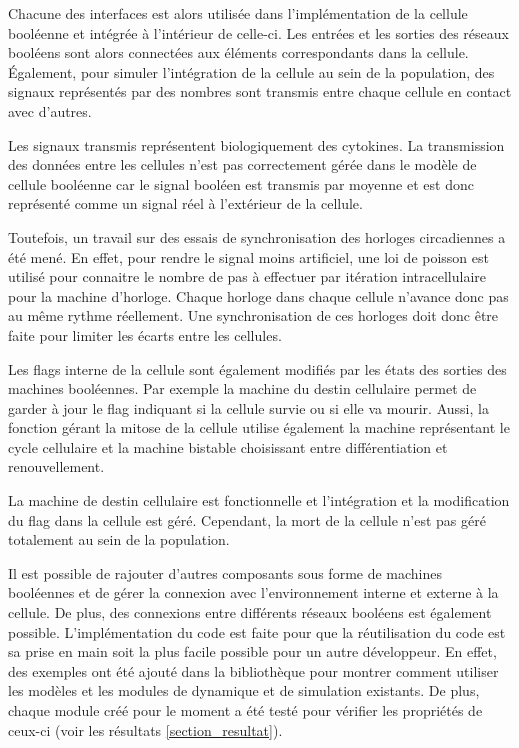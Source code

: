 \documentclass[11pt, a4paper]{article}
\begin{document}
Chacune des interfaces est alors utilisée dans l'implémentation de la cellule
booléenne et intégrée à l'intérieur de celle-ci. Les entrées et les sorties des
réseaux booléens sont alors connectées aux éléments correspondants dans la
cellule. Également, pour simuler l'intégration de la cellule au sein de la
population, des signaux représentés par des nombres sont transmis entre chaque
cellule en contact avec d'autres.

Les signaux transmis représentent biologiquement des cytokines. La transmission
des données entre les cellules n'est pas correctement gérée dans le modèle de
cellule booléenne car le signal booléen est transmis par moyenne et est donc
représenté comme un signal réel à l'extérieur de la cellule.

Toutefois, un travail sur des essais de synchronisation des horloges
circadiennes a été mené. En effet, pour rendre le signal moins artificiel, une
loi de poisson est utilisé pour connaitre le nombre de pas à effectuer par
itération intracellulaire pour la machine d'horloge. Chaque horloge dans
chaque cellule n'avance donc pas au même rythme réellement. Une synchronisation
de ces horloges doit donc être faite pour limiter les écarts entre les
cellules.

Les flags interne de la cellule sont également modifiés par les états des
sorties des machines booléennes. Par exemple la machine du destin cellulaire
permet de garder à jour le flag indiquant si la cellule survie ou si elle va
mourir. Aussi, la fonction gérant la mitose de la cellule utilise également la
machine représentant le cycle cellulaire et la machine bistable choisissant
entre différentiation et renouvellement.

La machine de destin cellulaire est fonctionnelle et l'intégration et la
modification du flag dans la cellule est géré. Cependant, la mort de la cellule
n'est pas géré totalement au sein de la population.

Il est possible de rajouter d'autres composants sous forme de machines
booléennes et de gérer la connexion avec l'environnement interne et externe à
la cellule. De plus, des connexions entre différents réseaux booléens est
également possible. L'implémentation du code est faite pour que la
réutilisation du code est sa prise en main soit la plus facile possible pour un
autre développeur. En effet, des exemples ont été ajouté dans la bibliothèque
pour montrer comment utiliser les modèles et les modules de dynamique et de
simulation existants. De plus, chaque module créé pour le moment a été testé
pour vérifier les propriétés de ceux-ci (voir les résultats
\ref{section_resultat}).
\end{document}

